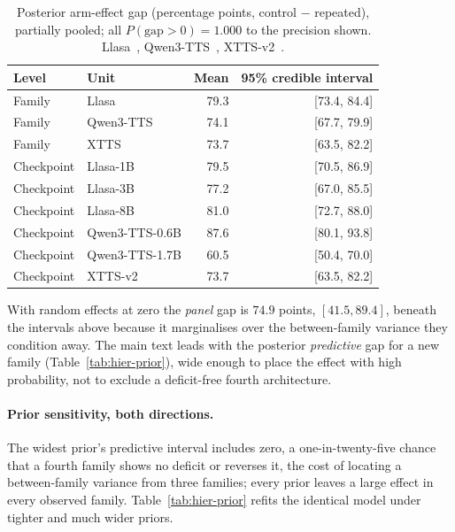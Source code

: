 \begin{table}[htbp]
\centering
\caption{Posterior arm-effect gap (percentage points, control $-$ repeated),
partially pooled; all $P(\mathrm{gap}>0)=1.000$ to the precision shown.
Llasa~\cite{ye2025llasa}, Qwen3-TTS~\cite{hu2026qwen3tts},
XTTS-v2~\cite{casanova2024xtts}.}
\label{tab:hier-bayes}
\small
\begin{tabular}{@{}llrr@{}}
\toprule
Level & Unit & Mean & 95\% credible interval \\
\midrule
Family & Llasa      & 79.3 & [73.4, 84.4] \\
Family & Qwen3-TTS  & 74.1 & [67.7, 79.9] \\
Family & XTTS       & 73.7 & [63.5, 82.2] \\
\addlinespace
Checkpoint & Llasa-1B & 79.5 & [70.5, 86.9] \\
Checkpoint & Llasa-3B & 77.2 & [67.0, 85.5] \\
Checkpoint & Llasa-8B & 81.0 & [72.7, 88.0] \\
Checkpoint & Qwen3-TTS-0.6B & 87.6 & [80.1, 93.8] \\
Checkpoint & Qwen3-TTS-1.7B & 60.5 & [50.4, 70.0] \\
Checkpoint & XTTS-v2 & 73.7 & [63.5, 82.2] \\
\bottomrule
\end{tabular}
\end{table}

With random effects at zero the \emph{panel} gap is $74.9$ points, $[41.5, 89.4]$, beneath the
intervals above because it marginalises over the between-family variance they condition away.
The main text leads with the posterior \emph{predictive} gap for a new family
(Table~\ref{tab:hier-prior}), wide enough to place the effect with high probability, not to
exclude a deficit-free fourth architecture.

\paragraph{Prior sensitivity, both directions.} The widest prior's predictive interval includes
zero, a one-in-twenty-five chance that a fourth family shows no deficit or reverses it, the cost
of locating a between-family variance from three families; every prior leaves a large effect in
every observed family. Table~\ref{tab:hier-prior} refits the identical model under tighter and
much wider priors.

